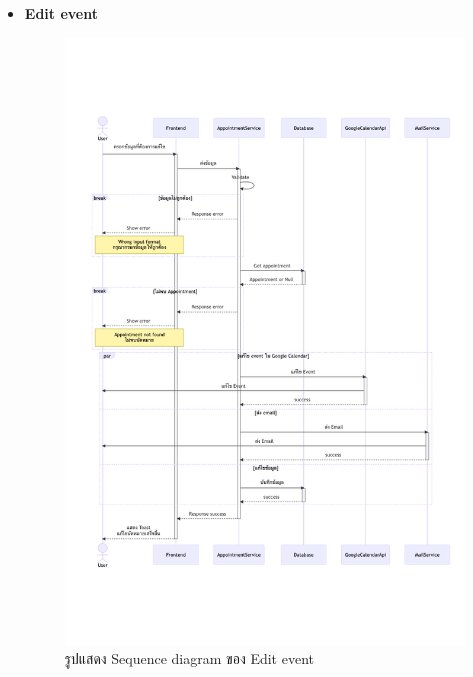 \documentclass[12pt,oneside,openright,a4paper]{cpe-thai-project}
\begin{document}
\begin{itemize}
    \newpage
    \item \textbf{Edit event} \\
    \begin{figure}[!ht]\centering
        \includegraphics[width=13cm, trim={0 5cm 0 5cm},clip]{./assets/sequence-diagram/edit-event.png}
        \caption{รูปแสดง Sequence diagram ของ Edit event}\label{fig:sqEditEvent}
    \end{figure}


\end{itemize}
\end{document}
